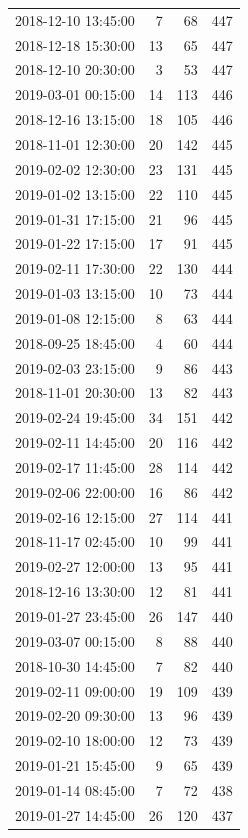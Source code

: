 \begin{tabular}{lrrr}
2018-12-10 13:45:00 & 7 & 68 & 447 \\
2018-12-18 15:30:00 & 13 & 65 & 447 \\
2018-12-10 20:30:00 & 3 & 53 & 447 \\
2019-03-01 00:15:00 & 14 & 113 & 446 \\
2018-12-16 13:15:00 & 18 & 105 & 446 \\
2018-11-01 12:30:00 & 20 & 142 & 445 \\
2019-02-02 12:30:00 & 23 & 131 & 445 \\
2019-01-02 13:15:00 & 22 & 110 & 445 \\
2019-01-31 17:15:00 & 21 & 96 & 445 \\
2019-01-22 17:15:00 & 17 & 91 & 445 \\
2019-02-11 17:30:00 & 22 & 130 & 444 \\
2019-01-03 13:15:00 & 10 & 73 & 444 \\
2019-01-08 12:15:00 & 8 & 63 & 444 \\
2018-09-25 18:45:00 & 4 & 60 & 444 \\
2019-02-03 23:15:00 & 9 & 86 & 443 \\
2018-11-01 20:30:00 & 13 & 82 & 443 \\
2019-02-24 19:45:00 & 34 & 151 & 442 \\
2019-02-11 14:45:00 & 20 & 116 & 442 \\
2019-02-17 11:45:00 & 28 & 114 & 442 \\
2019-02-06 22:00:00 & 16 & 86 & 442 \\
2019-02-16 12:15:00 & 27 & 114 & 441 \\
2018-11-17 02:45:00 & 10 & 99 & 441 \\
2019-02-27 12:00:00 & 13 & 95 & 441 \\
2018-12-16 13:30:00 & 12 & 81 & 441 \\
2019-01-27 23:45:00 & 26 & 147 & 440 \\
2019-03-07 00:15:00 & 8 & 88 & 440 \\
2018-10-30 14:45:00 & 7 & 82 & 440 \\
2019-02-11 09:00:00 & 19 & 109 & 439 \\
2019-02-20 09:30:00 & 13 & 96 & 439 \\
2019-02-10 18:00:00 & 12 & 73 & 439 \\
2019-01-21 15:45:00 & 9 & 65 & 439 \\
2019-01-14 08:45:00 & 7 & 72 & 438 \\
2019-01-27 14:45:00 & 26 & 120 & 437 \\

\end{tabular}
